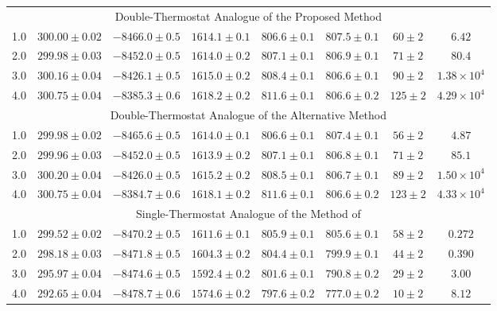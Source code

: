 \documentclass[
journal=jctcce,
layout=twocolumn
]{achemso}
\begin{document}
\begin{table}
\begin{tabular}{cccccccc}
\hline
\multicolumn{8}{c}{Double-Thermostat Analogue of the Proposed Method} \\
1.0 & $300.00\pm0.02$ & $-8466.0\pm0.5$ & $1614.1\pm0.1$ & $806.6\pm0.1$ & $807.5\pm0.1$ & $60\pm2$ & $6.42$\\
2.0 & $299.98\pm0.03$ & $-8452.0\pm0.5$ & $1614.0\pm0.2$ & $807.1\pm0.1$ & $806.9\pm0.1$ & $71\pm2$ & $80.4$ \\
3.0 & $300.16\pm0.04$ & $-8426.1\pm0.5$ & $1615.0\pm0.2$ & $808.4\pm0.1$ & $806.6\pm0.1$ & $90\pm2$ & $1.38\times10^4$ \\
4.0 & $300.75\pm0.04$ & $-8385.3\pm0.6$ & $1618.2\pm0.2$ & $811.6\pm0.1$ & $806.6\pm0.2$ & $125\pm2$ & $4.29\times10^4$ \\

\hline
\multicolumn{8}{c}{Double-Thermostat Analogue of the Alternative Method} \\
1.0 & $299.98\pm0.02$ & $-8465.6\pm0.5$ & $1614.0\pm0.1$ & $806.6\pm0.1$ & $807.4\pm0.1$ & $56\pm2$ & $4.87$ \\
2.0 & $299.96\pm0.03$ & $-8452.0\pm0.5$ & $1613.9\pm0.2$ & $807.1\pm0.1$ & $806.8\pm0.1$ & $71\pm2$ & $85.1$ \\
3.0 & $300.20\pm0.04$ & $-8426.0\pm0.5$ & $1615.2\pm0.2$ & $808.5\pm0.1$ & $806.7\pm0.1$ & $89\pm2$ & $1.50\times10^4$ \\
4.0 & $300.75\pm0.04$ & $-8384.7\pm0.6$ & $1618.1\pm0.2$ & $811.6\pm0.1$ & $806.6\pm0.2$ & $123\pm2$ & $4.33\times10^4$ \\

\hline
\multicolumn{8}{c}{Single-Thermostat Analogue of the Method of \citeauthor{Kamberaj_2005} \cite{Kamberaj_2005}} \\
1.0 & $299.52\pm0.02$ & $-8470.2\pm0.5$ & $1611.6\pm0.1$ & $805.9\pm0.1$ & $805.6\pm0.1$ & $58\pm2$ & $0.272$ \\
2.0 & $298.18\pm0.03$ & $-8471.8\pm0.5$ & $1604.3\pm0.2$ & $804.4\pm0.1$ & $799.9\pm0.1$ & $44\pm2$ & $0.390$ \\
3.0 & $295.97\pm0.04$ & $-8474.6\pm0.5$ & $1592.4\pm0.2$ & $801.6\pm0.1$ & $790.8\pm0.2$ & $29\pm2$ & $3.00$ \\
4.0 & $292.65\pm0.04$ & $-8478.7\pm0.6$ & $1574.6\pm0.2$ & $797.6\pm0.2$ & $777.0\pm0.2$ & $10\pm2$ & $8.12$ \\

\end{tabular}
\end{table}
\end{document}

